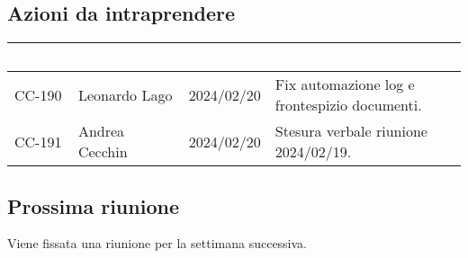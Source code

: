 \subsection{Azioni da intraprendere}
{
    \setlength{\tabcolsep}{10pt}
            \renewcommand{\arraystretch}{1.5}
            \begin{xltabular}{\textwidth}{| l | l | l | X |}
                 \hline
                 \textbf{\textcolor{white}{Codice }} & \textbf{\textcolor{white}{Assegnatario}} & \textbf{\textcolor{white}{Scadenza}} & \textbf{\textcolor{white}{Descrizione}} \\
                 \hline
                 CC-190 & Leonardo Lago & 2024/02/20 & Fix automazione log e frontespizio documenti.\\
                 \hline
                 CC-191 & Andrea Cecchin & 2024/02/20 & Stesura verbale riunione 2024/02/19.\\
                 \hline
                 
            \end{xltabular}
}

\subsection{Prossima riunione} \label{subsec:riunione}
Viene fissata una riunione per la settimana successiva.
